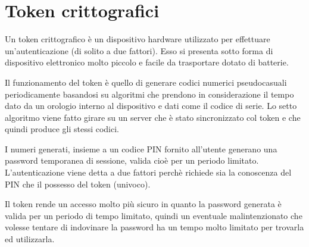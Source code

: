 \chapter{Token crittografici}
\label{chapter3}

Un token crittografico è un dispositivo hardware utilizzato per effettuare un'autenticazione (di solito a due fattori). Esso si presenta sotto forma di dispositivo elettronico molto piccolo e facile da trasportare dotato di batterie.

Il funzionamento del token è quello di generare codici numerici pseudocasuali periodicamente basandosi su algoritmi che prendono in considerazione il tempo dato da un orologio interno al dispositivo e dati come il codice di serie. Lo setto algoritmo viene fatto girare su un server che è stato sincronizzato col token e che quindi produce gli stessi codici.

I numeri generati, insieme a un codice PIN fornito all'utente generano una password temporanea di sessione, valida cioè per un periodo limitato. L'autenticazione viene detta a due fattori perchè richiede sia la conoscenza del PIN che il possesso del token (univoco).

Il token rende un accesso molto più sicuro in quanto la password generata è valida per un periodo di tempo limitato, quindi un eventuale malintenzionato che volesse tentare di indovinare la password ha un tempo molto limitato per trovarla ed utilizzarla.
\cite{wiki_token}
